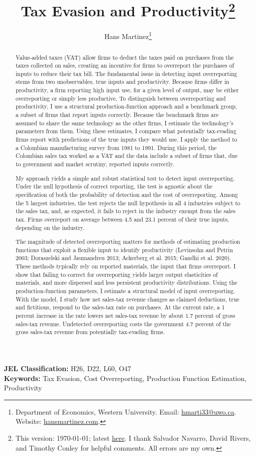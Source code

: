 \documentclass[
  12pt]{article}
\title{Tax Evasion and Productivity\thanks{This version: \today; latest
\href{https://hansmartinez.com/project/tax_prod/}{here}. I thank
Salvador Navarro, David Rivers, and Timothy Conley for helpful comments.
All errors are my own.}}
\author{Hans Martinez\thanks{Department of Economics, Western
University. Email: \href{mailto:hmarti33@uwo.ca}{hmarti33@uwo.ca}. Website: \href{https://hansmartinez.com}{hansmartinez.com}.}}
\date{}
\begin{document}
\maketitle
\begin{abstract}
Value-added taxes (VAT) allow firms to deduct the taxes paid on
purchases from the taxes collected on sales, creating an incentive for
firms to overreport the purchases of inputs to reduce their tax bill.
The fundamental issue in detecting input overreporting stems from two
unobservables, true inputs and productivity. Because firms differ in
productivity, a firm reporting high input use, for a given level of
output, may be either overreporting or simply less productive. To
distinguish between overreporting and productivity, I use a structural
production-function approach and a benchmark group, a subset of firms
that report inputs correctly. Because the benchmark firms are assumed to
share the same technology as the other firms, I estimate the
technology's parameters from them. Using these estimates, I compare what
potentially tax-evading firms report with predictions of the true inputs
they would use. I apply the method to a Colombian manufacturing survey
from 1981 to 1991. During this period, the Colombian sales tax worked as
a VAT and the data include a subset of firms that, due to government and
market scrutiny, reported inputs correctly.

My approach yields a simple and robust statistical test to detect input
overreporting. Under the null hypothesis of correct reporting, the test
is agnostic about the specification of both the probability of detection
and the cost of overreporting. Among the 5 largest industries, the test
rejects the null hypothesis in all 4 industries subject to the sales
tax, and, as expected, it fails to reject in the industry exempt from
the sales tax. Firms overreport on average between 4.5 and 23.1 percent
of their true inputs, depending on the industry.

The magnitude of detected overreporting matters for methods of
estimating production functions that exploit a flexible input to
identify productivity (Levinsohn and Petrin 2003; Doraszelski and
Jaumandreu 2013; Ackerberg et al. 2015; Gandhi et al. 2020). These
methods typically rely on reported materials, the input that firms
overreport. I show that failing to correct for overreporting yields
larger output elasticities of materials, and more dispersed and less
persistent productivity distributions. Using the production-function
parameters, I estimate a structural model of input overreporting. With
the model, I study how net sales-tax revenue changes as claimed
deductions, true and fictitious, respond to the sales-tax rate on
purchases. At the current rate, a 1 percent increase in the rate lowers
net sales-tax revenue by about 1.7 percent of gross sales-tax revenue.
Undetected overreporting costs the government 4.7 percent of the gross
sales-tax revenue from potentially tax-evading firms.
\end{abstract}

\begin{center}
\textbf{JEL Classification:} H26, D22, L60, O47 \\
\textbf{Keywords:} Tax Evasion, Cost Overreporting, Production Function Estimation, Productivity
\end{center}
\bigskip


\end{document}
